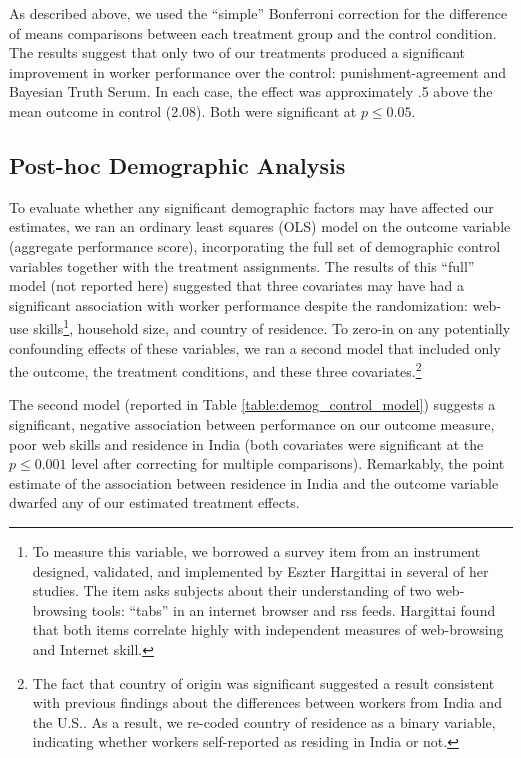 \documentclass{chi2009}
\begin{document}
As described above, we used the ``simple'' Bonferroni correction for
the difference of means comparisons between each treatment group and
the control condition. The results suggest that only two of our
treatments produced a significant improvement in worker performance
over the control: punishment-agreement and Bayesian Truth Serum. In
each case, the effect was approximately .5 above the mean outcome in
control (2.08). Both were significant at $p \leq0.05$.


\subsection{Post-hoc Demographic Analysis}
To evaluate whether any significant demographic factors may have
affected our estimates, we ran an ordinary least squares (OLS) model
on the outcome variable (aggregate performance score), incorporating
the full set of demographic control variables together with the
treatment assignments. The results of this ``full'' model (not
reported here) suggested that three covariates may have had a
significant association with worker performance despite the
randomization: web-use skills\footnote{To measure this variable, we
  borrowed a survey item from an instrument designed, validated, and
  implemented by Eszter Hargittai in several of her
  studies.\cite{hargittai2009update} The item asks subjects about
  their understanding of two web-browsing tools: ``tabs'' in an
  internet browser and rss feeds. Hargittai found that both items
  correlate highly with independent measures of web-browsing and
  Internet skill.}, household size, and country of residence. To
zero-in on any potentially confounding effects of these variables, we
ran a second model that included only the outcome, the treatment
conditions, and these three covariates.\footnote{The fact that country
  of origin was significant suggested a result consistent with
  previous findings about the differences between workers from India
  and the U.S.\cite{ipeirotis2010}. As a result, we re-coded country
  of residence as a binary variable, indicating whether workers
  self-reported as residing in India or not.}

The second model (reported in Table \ref{table:demog_control_model})
suggests a significant, negative association between performance on
our outcome measure, poor web skills and residence in India (both
covariates were significant at the $p \leq 0.001$ level after
correcting for multiple comparisons). Remarkably, the point estimate
of the association between residence in India and the outcome variable
dwarfed any of our estimated treatment effects.
\end{document}
